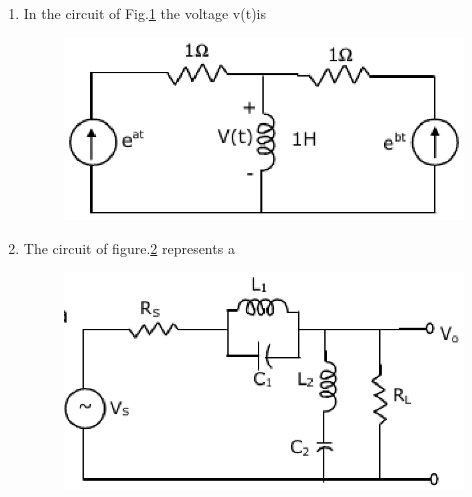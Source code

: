 \documentclass[journal,12pt,twocolumn]{IEEEtran}
\begin{document}
\begin{enumerate}
\item In the circuit of Fig.\ref{fig30} the voltage v(t)is
\begin{figure}[!h]
\begin{center}
\includegraphics[scale=0.5]{./figs/fig30.eps}
\caption{}
\label{fig30}
\end{center}
\end{figure}

\begin{enumerate}
\setlength\itemsep{2em}

\end{enumerate}

\item The circuit of figure.\ref{fig31} represents a
\begin{enumerate}
\setlength\itemsep{2em}
\begin{figure}[!h]
\begin{center}
\includegraphics[scale=0.5]{./figs/fig31.eps}
\caption{}
\label{fig31}
\end{center}
\end{figure}
\end{enumerate}


\end{enumerate}
\end{document}
